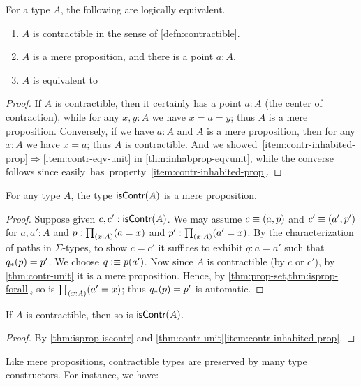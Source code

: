 \begin{lem}\label{thm:contr-unit}
  For a type $A$, the following are logically equivalent.
  \begin{enumerate}
  \item $A$ is contractible in the sense of \cref{defn:contractible}.\label{item:contr}
  \item $A$ is a mere proposition, and there is a point $a:A$.\label{item:contr-inhabited-prop}
  \item $A$ is equivalent to \unit.\label{item:contr-eqv-unit}
  \end{enumerate}
\end{lem}
\begin{proof}
  If $A$ is contractible, then it certainly has a point $a:A$ (the center of contraction), while for any $x,y:A$ we have $x=a=y$; thus $A$ is a mere proposition.
  Conversely, if we have $a:A$ and $A$ is a mere proposition, then for any $x:A$ we have $x=a$; thus $A$ is contractible.
  And we showed~\ref{item:contr-inhabited-prop}$\Rightarrow$\ref{item:contr-eqv-unit} in \cref{thm:inhabprop-eqvunit}, while the converse follows since \unit easily has property~\ref{item:contr-inhabited-prop}.
\end{proof}

\begin{lem}\label{thm:isprop-iscontr}
  For any type $A$, the type $\mathsf{isContr}(A)$ is a mere proposition.
\end{lem}
\begin{proof}
  Suppose given $c,c':\mathsf{isContr}(A)$.
  We may assume $c\equiv(a,p)$ and $c'\equiv(a',p')$ for $a,a':A$ and $p:\prd{x:A} (a=x)$ and $p':\prd{x:A} (a'=x)$.
  By the characterization of paths in $\Sigma$-types, to show $c=c'$ it suffices to exhibit $q:a=a'$ such that ${q}_{*}\mathopen{}\left({p}\right)\mathclose{}=p'$.
  We choose $q\vcentcolon\equiv p(a')$.
  Now since $A$ is contractible (by $c$ or $c'$), by \cref{thm:contr-unit} it is a mere proposition.
  Hence, by \cref{thm:prop-set,thm:isprop-forall}, so is $\prd{x:A}(a'=x)$; thus ${q}_{*}\mathopen{}\left({p}\right)\mathclose{}=p'$ is automatic.
\end{proof}

\begin{cor}\label{thm:contr-contr}
  If $A$ is contractible, then so is $\mathsf{isContr}(A)$.
\end{cor}
\begin{proof}
  By \cref{thm:isprop-iscontr} and \cref{thm:contr-unit}\ref{item:contr-inhabited-prop}.
\end{proof}

Like mere propositions, contractible types are preserved by many type constructors.
For instance, we have:

